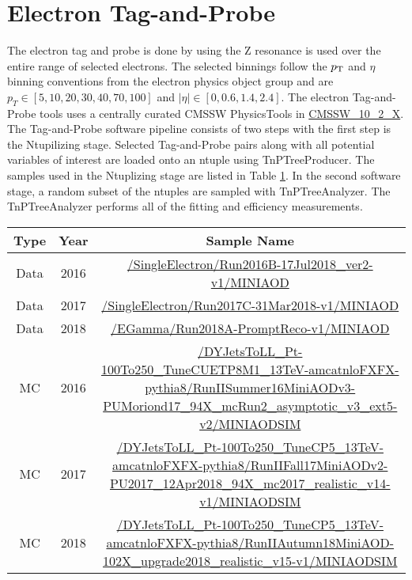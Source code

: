 
\FloatBarrier
\section{Electron Tag-and-Probe }

The electron tag and probe is done by using the Z resonance is used over the entire \pt range of selected electrons. The selected binnings follow the $p_{\mathrm{T}}$ and $\eta$ binning conventions from the electron physics object group and are $ p_T \in [5, 10, 20, 30, 40, 70, 100]$ and $|\eta| \in [ 0, 0.6, 1.4, 2.4]$. The electron Tag-and-Probe tools uses a centrally curated CMSSW PhysicsTools in \url{CMSSW_10_2_X}. The Tag-and-Probe software pipeline consists of two steps with the first step is the Ntupilizing stage. Selected Tag-and-Probe pairs along with all potential variables of interest are loaded onto an ntuple using TnPTreeProducer. The samples used in the Ntuplizing stage are listed in Table \ref{tab:electronTnPSamples}. In the second software stage, a random subset of the ntuples are sampled with TnPTreeAnalyzer. The TnPTreeAnalyzer performs all of the fitting and efficiency measurements. 


\begin{table}
\scriptsize
\begin{tabular}{|c|c|c|}
\hline 
Type & Year & Sample Name \\ 
\hline 
Data & 2016 & \tiny \url{/SingleElectron/Run2016B-17Jul2018_ver2-v1/MINIAOD}  \\  
Data & 2017 & \tiny \url{/SingleElectron/Run2017C-31Mar2018-v1/MINIAOD} \\  
Data & 2018 & \tiny \url{/EGamma/Run2018A-PromptReco-v1/MINIAOD} \\ 
\hline 
MC & 2016 & \tiny \url{/DYJetsToLL_Pt-100To250_TuneCUETP8M1_13TeV-amcatnloFXFX-pythia8/RunIISummer16MiniAODv3-PUMoriond17_94X_mcRun2_asymptotic_v3_ext5-v2/MINIAODSIM} \\ 
MC & 2017 & \tiny \url{/DYJetsToLL_Pt-100To250_TuneCP5_13TeV-amcatnloFXFX-pythia8/RunIIFall17MiniAODv2-PU2017_12Apr2018_94X_mc2017_realistic_v14-v1/MINIAODSIM} \\ 
MC & 2018 & \tiny \url{/DYJetsToLL_Pt-100To250_TuneCP5_13TeV-amcatnloFXFX-pythia8/RunIIAutumn18MiniAOD-102X_upgrade2018_realistic_v15-v1/MINIAODSIM} \\ 
\hline
\end{tabular} 
\label{tab:electronTnPSamples}
\end{table}




